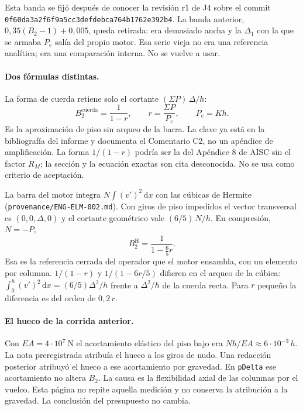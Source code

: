 Esta banda se fijó después de conocer la revisión r1 de J4 sobre el commit \texttt{0f60da3a2f6f9a5cc3defdebca764b1762e392b4}. La banda anterior, \(0{,}35(B_2-1)+0{,}005\), queda retirada: era demasiado ancha y la \(\Delta_1\) con la que se armaba \(P_e\) salía del propio motor. Esa serie vieja no era una referencia analítica; era una comparación interna. No se vuelve a usar.

\paragraph{Dos fórmulas distintas.}
La forma de cuerda retiene solo el cortante \((\Sigma P)\,\Delta/h\):
\begin{equation}
B_2^{\mathrm{cuerda}}=\frac{1}{1-r},\qquad r=\frac{\Sigma P}{P_e},\qquad P_e=Kh.
\label{eq:val037-cuerda}
\end{equation}
Es la aproximación de piso sin arqueo de la barra. La clave \cite{aisc16} ya está en la bibliografía del informe y documenta el Comentario C2, no un apéndice de amplificación. La forma \(1/(1-r)\) podría ser la del Apéndice 8 de AISC sin el factor \(R_M\); la sección y la ecuación exactas son cita desconocida. No se usa como criterio de aceptación.

La barra del motor integra \(N\int (v')^2\,\mathrm{d}x\) con las cúbicas de Hermite (\texttt{provenance/ENG-ELM-002.md}). Con giros de piso impedidos el vector transversal es \((0,0,\Delta,0)\) y el cortante geométrico vale \((6/5)\,N/h\). En compresión, \(N=-P\),
\begin{equation}
B_2^{\mathrm{H}}=\frac{1}{1-\tfrac{6}{5}r}.
\label{eq:val037-hermite}
\end{equation}
Esa es la referencia cerrada del operador que el motor ensambla, con un elemento por columna. \(1/(1-r)\) y \(1/(1-6r/5)\) difieren en el arqueo de la cúbica: \(\int_0^h(v')^2\,\mathrm{d}x=(6/5)\Delta^2/h\) frente a \(\Delta^2/h\) de la cuerda recta. Para \(r\) pequeño la diferencia es del orden de \(0{,}2\,r\).

\paragraph{El hueco de la corrida anterior.}
Con \(EA=4\cdot 10^{7}~\mathrm{N}\) el acortamiento elástico del piso bajo era \(Nh/EA\approx 6\cdot 10^{-3}\,h\). La nota preregistrada atribuía el hueco a los giros de nudo. Una redacción posterior atribuyó el hueco a ese acortamiento por gravedad. En \texttt{pDelta} ese acortamiento no altera \(B_2\). La causa es la flexibilidad axial de las columnas por el vuelco. Esta página no repite aquella medición y no conserva la atribución a la gravedad. La conclusión del presupuesto no cambia.

